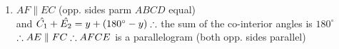 \begin{eocsolutions}{}
{\begin{enumerate}[itemsep=5pt, label=\textbf{\arabic*}. ]
\begin{enumerate}[noitemsep, label=\textbf{(\alph*)} ]
In $\triangle ADE$\\
$\hat{D} + \hat{A_1} + \hat{E_1} = 180^{\circ}$ (sum of $\angle$'s in $\triangle$)\\
$\therefore \hat{D} + y + y = 180^{\circ}\\
\therefore \hat{D} = 180^{\circ} - 2y$\\
$\hat{D} = 90^{\circ} - y\\
\therefore \hat{B} = 90^{\circ} - y$ (opp. $\angle$'s parm $ABCD$ equal)\\

\item 
$AF\parallel EC$ (opp. sides parm $ABCD$ equal)\\
and $\hat{C_1} + \hat{E_2} = y + (180^{\circ} - y)\\
\therefore $ the sum of the co-interior angles is $180^{\circ}$\\
$\therefore AE \parallel FC\\
\therefore AFCE$ is a parallelogram (both opp. sides parallel)
\end{enumerate}


\end{enumerate}}
\end{eocsolutions}
